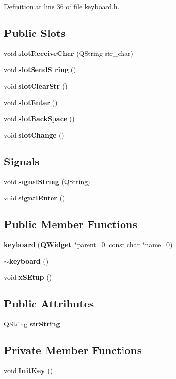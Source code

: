 Definition at line 36 of file keyboard.h.\subsection*{Public Slots}
\begin{CompactItemize}
\item 
void {\bf slot\-Receive\-Char} (QString str\_\-char)
\item 
void {\bf slot\-Send\-String} ()
\item 
void {\bf slot\-Clear\-Str} ()
\item 
void {\bf slot\-Enter} ()
\item 
void {\bf slot\-Back\-Space} ()
\item 
void {\bf slot\-Change} ()
\end{CompactItemize}
\subsection*{Signals}
\begin{CompactItemize}
\item 
void {\bf signal\-String} (QString)
\item 
void {\bf signal\-Enter} ()
\end{CompactItemize}
\subsection*{Public Member Functions}
\begin{CompactItemize}
\item 
{\bf keyboard} ({\bf QWidget} $\ast$parent=0, const char $\ast$name=0)
\item 
{\bf $\sim$keyboard} ()
\item 
void {\bf x\-SEtup} ()
\end{CompactItemize}
\subsection*{Public Attributes}
\begin{CompactItemize}
\item 
QString {\bf str\-String}
\end{CompactItemize}
\subsection*{Private Member Functions}
\begin{CompactItemize}
\item 
void {\bf Init\-Key} ()
\end{CompactItemize}

